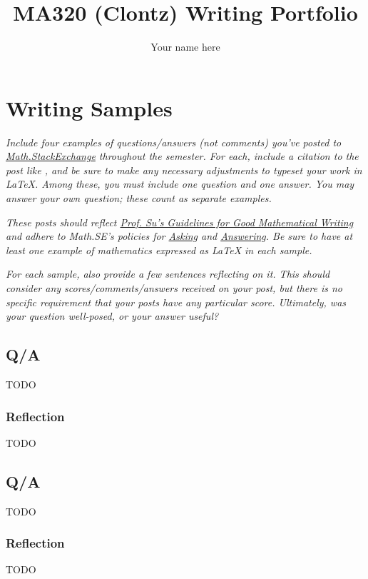 \documentclass{article}
\title{MA320 (Clontz) Writing Portfolio}
\author{Your name here}
\begin{document}
\maketitle

\section{Writing Samples}
\textit{Include four examples of questions/answers
(not comments) you've posted to
\href{https://math.stackexchange.com/}
{Math.StackExchange} throughout the semester. For each, include
a citation to the post like \cite{1089984},
and be sure to make any necessary adjustments to
typeset your work in LaTeX. Among these, you must include one
question and one answer. You may answer your own question; these
count as separate examples.}

\textit{These posts should reflect
\href{https://usaonline.southalabama.edu/courses/35295/files/6197333?wrap=1}
{Prof. Su's Guidelines for Good Mathematical Writing}
and adhere to Math.SE's policies for
\href{https://math.stackexchange.com/help/asking}
{Asking}
and
\href{https://math.stackexchange.com/help/answering}
{Answering}. Be sure to have at least one example of mathematics
expressed as \LaTeX{} in each sample.}

\textit{For each sample, also provide a few sentences reflecting on it.
This should consider any scores/comments/answers received on your post,
but there is no specific requirement that your posts have any particular
score. Ultimately, was your question well-posed, or your answer useful?}

\subsection{Q/A}
TODO \cite{1089984}

\subsubsection*{Reflection}
TODO

\subsection{Q/A}
TODO \cite{1089984}

\subsubsection*{Reflection}
TODO
\end{document}
